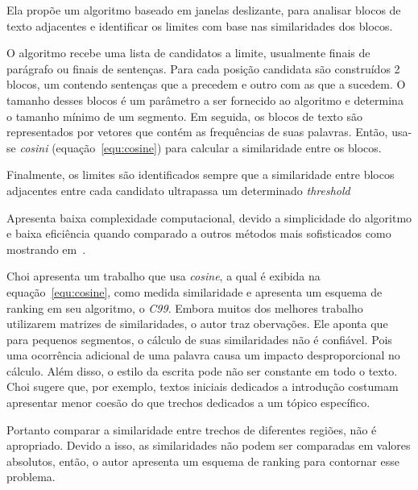 Ela propõe um algoritmo baseado em janelas deslizante, para analisar blocos de texto adjacentes e identificar os limites com base nas similaridades dos blocos.

O algoritmo recebe uma lista de candidatos a limite, usualmente finais de parágrafo ou finais de sentenças. Para cada posição candidata são construídos 2 blocos, um contendo sentenças que a precedem e outro com as que a sucedem. O tamanho desses blocos é um parâmetro a ser fornecido ao algoritmo e determina o tamanho mínimo de um segmento.
%
Em seguida, os blocos de texto são representados por vetores que contém as frequências de suas palavras. Então, usa-se \textit{cosini} (equação~\ref{equ:cosine}) para calcular a similaridade entre os blocos.

Finalmente, os limites são identificados sempre que a similaridade entre blocos adjacentes entre cada candidato ultrapassa um determinado \textit{threshold}

Apresenta baixa complexidade computacional, devido a simplicidade do algoritmo e baixa eficiência quando comparado a outros métodos mais sofisticados como mostrando em~\cite{Choi2000, Kern2009167}.








Choi \cite{Choi2000} apresenta um trabalho que usa \textit{cosine}, a qual é exibida na equação~\ref{equ:cosine}, como medida similaridade e apresenta um esquema de ranking em seu algoritmo, o \textit{C99}. 
%
Embora muitos dos melhores trabalho utilizarem matrizes de similaridades, o autor traz obervações.
%
Ele aponta que para pequenos segmentos, o cálculo de suas similaridades não é confiável. Pois uma ocorrência adicional de uma palavra causa um impacto desproporcional no cálculo.
%
Além disso, o estilo da escrita pode não ser constante em todo o texto. Choi sugere que, por exemplo, textos iniciais dedicados a introdução costumam apresentar menor coesão do que trechos dedicados a um tópico específico. 
%

Portanto comparar a similaridade entre trechos de diferentes regiões, não é apropriado.
Devido a isso, as similaridades não podem ser comparadas em valores absolutos,  então, o autor apresenta um esquema de ranking para contornar esse problema.
%



